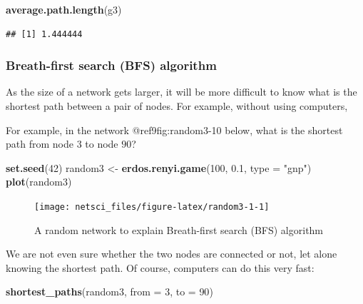 \documentclass[
]{krantz}
\makeatletter
\newenvironment{Shaded}{\begin{snugshade}}{\end{snugshade}}
\newcommand{\DataTypeTok}[1]{\textcolor[rgb]{0.27,0.27,0.27}{#1}}
\newcommand{\DecValTok}[1]{\textcolor[rgb]{0.06,0.06,0.06}{#1}}
\newcommand{\FloatTok}[1]{\textcolor[rgb]{0.06,0.06,0.06}{#1}}
\newcommand{\KeywordTok}[1]{\textcolor[rgb]{0.27,0.27,0.27}{\textbf{#1}}}
\newcommand{\NormalTok}[1]{#1}
\newcommand{\StringTok}[1]{\textcolor[rgb]{0.5,0.5,0.5}{#1}}
\newenvironment{kframe}{%
\medskip{}
\setlength{\fboxsep}{.8em}
 \def\at@end@of@kframe{}%
 \ifinner\ifhmode%
  \def\at@end@of@kframe{\end{minipage}}%
  \begin{minipage}{\columnwidth}%
 \fi\fi%
 \def\FrameCommand##1{\hskip\@totalleftmargin \hskip-\fboxsep
 \colorbox{shadecolor}{##1}\hskip-\fboxsep
     \hskip-\linewidth \hskip-\@totalleftmargin \hskip\columnwidth}%
 \MakeFramed {\advance\hsize-\width
   \@totalleftmargin\z@ \linewidth\hsize
   \@setminipage}}%
 {\par\unskip\endMakeFramed%
 \at@end@of@kframe}
\renewenvironment{Shaded}{\begin{kframe}}{\end{kframe}}
\makeatother
\begin{document}
\begin{Shaded}
\begin{Highlighting}[]
\KeywordTok{average.path.length}\NormalTok{(g3)}
\end{Highlighting}
\end{Shaded}

\begin{verbatim}
## [1] 1.444444
\end{verbatim}

\hypertarget{breath-first-search-bfs-algorithm}{%
\subsubsection{Breath-first search (BFS) algorithm}\label{breath-first-search-bfs-algorithm}}

As the size of a network gets larger, it will be more difficult to know what is the shortest path between a pair of nodes. For example, without using computers,

For example, in the network @ref9fig:random3-10 below, what is the shortest path from node \(3\) to node \(90\)?

\begin{Shaded}
\begin{Highlighting}[]
\KeywordTok{set.seed}\NormalTok{(}\DecValTok{42}\NormalTok{)}
\NormalTok{random3 <-}\StringTok{ }\KeywordTok{erdos.renyi.game}\NormalTok{(}\DecValTok{100}\NormalTok{, }\FloatTok{0.1}\NormalTok{, }\DataTypeTok{type =} \StringTok{"gnp"}\NormalTok{)}
\KeywordTok{plot}\NormalTok{(random3)}
\end{Highlighting}
\end{Shaded}

\begin{figure}

{\centering \texttt{[image: netsci\_files/figure-latex/random3-1-1]} 

}

\caption{A random network to explain Breath-first search (BFS) algorithm}\label{fig:random3-1}
\end{figure}

We are not even sure whether the two nodes are connected or not, let alone knowing the shortest path. Of course, computers can do this very fast:

\begin{Shaded}
\begin{Highlighting}[]
\KeywordTok{shortest_paths}\NormalTok{(random3, }\DataTypeTok{from =} \DecValTok{3}\NormalTok{, }\DataTypeTok{to =} \DecValTok{90}\NormalTok{)}
\end{Highlighting}
\end{Shaded}
\end{document}
